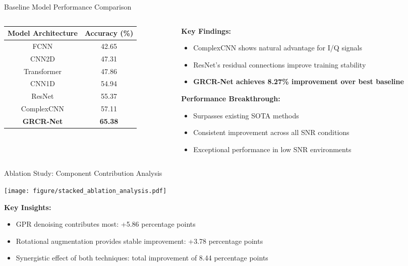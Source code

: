 \documentclass[aspectratio=169]{beamer}
\begin{document}
\begin{frame}{Baseline Model Performance Comparison}
\begin{columns}
\begin{column}{0.5\textwidth}
\begin{table}[h]
\centering
\begin{tabular}{@{}cc@{}}
\toprule
\textbf{Model Architecture} & \textbf{Accuracy (\%)} \\
\midrule
FCNN & 42.65 \\
CNN2D & 47.31 \\
Transformer & 47.86 \\
CNN1D & 54.94 \\
ResNet & 55.37 \\
ComplexCNN & 57.11 \\
\midrule
\textcolor{zjutred}{\textbf{GRCR-Net}} & \textcolor{zjutred}{\textbf{65.38}} \\
\bottomrule
\end{tabular}
\end{table}
\end{column}
\begin{column}{0.5\textwidth}
\textbf{Key Findings:}
\begin{itemize}
\item ComplexCNN shows natural advantage for I/Q signals
\item ResNet's residual connections improve training stability
\item \textcolor{zjutred}{\textbf{GRCR-Net achieves 8.27\% improvement over best baseline}}
\end{itemize}

\vspace{0.5cm}
\textbf{Performance Breakthrough:}
\begin{itemize}
\item Surpasses existing SOTA methods
\item Consistent improvement across all SNR conditions
\item Exceptional performance in low SNR environments
\end{itemize}
\end{column}
\end{columns}
\end{frame}

\begin{frame}{Ablation Study: Component Contribution Analysis}
\begin{center}
\texttt{[image: figure/stacked\_ablation\_analysis.pdf]}
\end{center}

\textbf{Key Insights:}
\begin{itemize}
\item GPR denoising contributes most: +5.86 percentage points
\item Rotational augmentation provides stable improvement: +3.78 percentage points
\item Synergistic effect of both techniques: total improvement of 8.44 percentage points
\end{itemize}
\end{frame}
\end{document}
